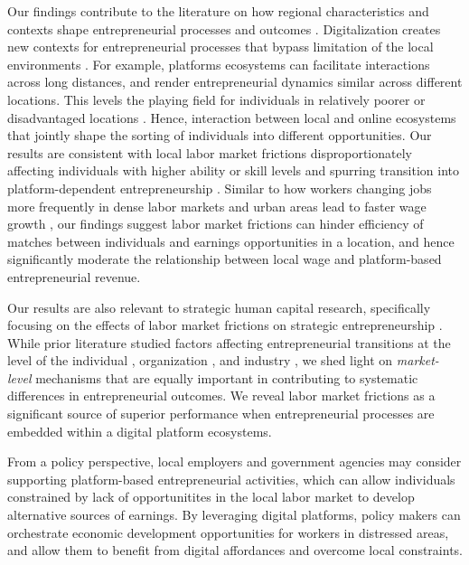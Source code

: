 \documentclass[letterpaper,12pt]{article}
\begin{document}
Our findings contribute to the literature on how regional characteristics and contexts shape entrepreneurial processes and outcomes \citep{jack_effects_2002,peer_are_2013,autio_entrepreneurial_2014,plummer_localized_2014,amezcua_organizational_2020}. Digitalization creates new contexts for entrepreneurial processes that bypass limitation of the local environments \citep{nambisan_digital_2017}. For example, platforms ecosystems can facilitate interactions across long distances, and render entrepreneurial dynamics similar across different locations. This levels the playing field for individuals in relatively poorer or disadvantaged locations \citep{stanton_who_2021,braesemann_icts_2022}. Hence, interaction between local and online ecosystems that jointly shape the sorting of individuals into different opportunities. Our results are consistent with local labor market frictions disproportionately affecting individuals with higher ability or skill levels and spurring transition into platform-dependent entrepreneurship \citep{hacamo_forced_2022}. Similar to how workers changing jobs more frequently in dense labor markets and urban areas lead to faster wage growth \citep{wheeler_cities_2006,finney_effect_2008}, our findings suggest labor market frictions can hinder efficiency of matches between individuals and earnings opportunities in a location, and hence significantly moderate the relationship between local wage and platform-based entrepreneurial revenue.

Our results are also relevant to strategic human capital research, specifically focusing on the effects of labor market frictions on strategic entrepreneurship \citep{campbell_rethinking_2012,mahoney_market_2013,campbell_bridging_2017,starr_strategic_2018}. While prior literature studied factors affecting entrepreneurial transitions at the level of the individual \citep{roach_founder_2015}, organization \citep{carnahan_heterogeneity_2012}, and industry \citep{ozcan_transition_2009}, we shed light on \textit{market-level} mechanisms that are equally important in contributing to systematic differences in entrepreneurial outcomes. We reveal labor market frictions as a significant source of superior performance when entrepreneurial processes are embedded within a digital platform ecosystems.

From a policy perspective, local employers and government agencies may consider supporting platform-based entrepreneurial activities, which can allow individuals constrained by lack of opportunitites in the local labor market to develop alternative sources of earnings. By leveraging digital platforms, policy makers can orchestrate economic development opportunities for workers in distressed areas, and allow them to benefit from digital affordances and overcome local constraints.
\end{document}

